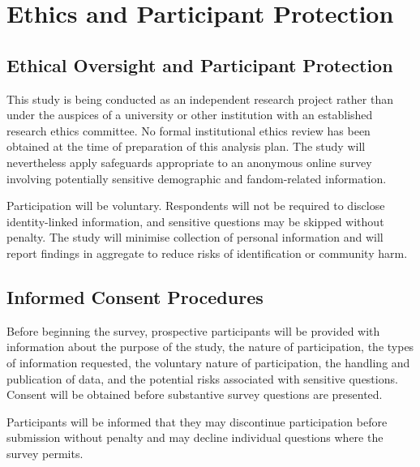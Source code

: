 \section{Ethics and Participant Protection}
\label{sec:ethics}

\subsection{Ethical Oversight and Participant Protection}

This study is being conducted as an independent research project rather than under the auspices of a university or other institution with an established research ethics committee. No formal institutional ethics review has been obtained at the time of preparation of this analysis plan. The study will nevertheless apply safeguards appropriate to an anonymous online survey involving potentially sensitive demographic and fandom-related information.

Participation will be voluntary. Respondents will not be required to disclose identity-linked information, and sensitive questions may be skipped without penalty. The study will minimise collection of personal information and will report findings in aggregate to reduce risks of identification or community harm.


\subsection{Informed Consent Procedures}

Before beginning the survey, prospective participants will be provided with information about the purpose of the study, the nature of participation, the types of information requested, the voluntary nature of participation, the handling and publication of data, and the potential risks associated with sensitive questions. Consent will be obtained before substantive survey questions are presented.

Participants will be informed that they may discontinue participation before submission without penalty and may decline individual questions where the survey permits.


